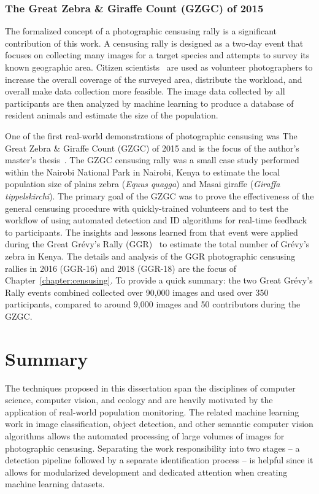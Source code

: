 \subsubsection{The Great Zebra \& Giraffe Count (GZGC) of 2015}

The formalized concept of a photographic censusing rally is a significant contribution of this work.  A censusing rally is designed as a two-day event that focuses on collecting many images for a target species and attempts to survey its known geographic area.  Citizen scientists~\cite{cohn_citizen_2008,irwin_citizen_1995,silvertown_new_2009} are used as volunteer photographers to increase the overall coverage of the surveyed area, distribute the workload, and overall make data collection more feasible.  The image data collected by all participants are then analyzed by machine learning to produce a database of resident animals and estimate the size of the population.

One of the first real-world demonstrations of photographic censusing was The Great Zebra \& Giraffe Count (GZGC) of 2015 and is the focus of the author's master's thesis~\cite{parham_photographic_2015}.  The GZGC censusing rally was a small case study performed within the Nairobi National Park in Nairobi, Kenya to estimate the local population size of plains zebra (\textit{Equus quagga}) and Masai giraffe (\textit{Giraffa tippelskirchi}).  The primary goal of the GZGC was to prove the effectiveness of the general censusing procedure with quickly-trained volunteers and to test the workflow of using automated detection and ID algorithms for real-time feedback to participants.  The insights and lessons learned from that event were applied during the Great Gr\'evy's Rally (GGR)~\cite{berger-wolf_great_2016,rubenstein_state_2018} to estimate the total number of Gr\'evy's zebra in Kenya.  The details and analysis of the GGR photographic censusing rallies in 2016 (GGR-16) and 2018 (GGR-18) are the focus of Chapter~\ref{chapter:censusing}.  To provide a quick summary: the two Great Gr\'evy's Rally events combined collected over 90,000 images and used over 350 participants, compared to around 9,000 images and 50 contributors during the GZGC.

\section{Summary}

The techniques proposed in this dissertation span the disciplines of computer science, computer vision, and ecology and are heavily motivated by the application of real-world population monitoring.  The related machine learning work in image classification, object detection, and other semantic computer vision algorithms allows the automated processing of large volumes of images for photographic censusing.  Separating the work responsibility into two stages -- a detection pipeline followed by a separate identification process -- is helpful since it allows for modularized development and dedicated attention when creating machine learning datasets.
